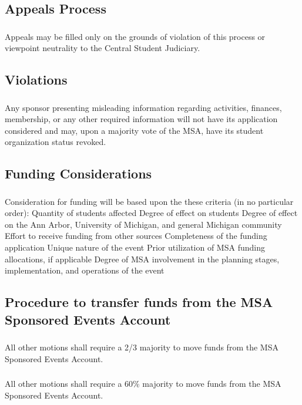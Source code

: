 \subsection{Appeals Process}
\subsubsection{}
Appeals may be filled only on the grounds of violation of this process or viewpoint neutrality to the Central Student Judiciary. 

\subsection{Violations}
\subsubsection{}
Any sponsor presenting misleading information regarding activities, finances, membership, or any other required information will not have its application considered and may, upon a majority vote of the MSA, have its student organization status revoked.  

\subsection{Funding Considerations}

\subsubsection{}
Consideration for funding will be based upon the these criteria (in no particular order):
\subsubsubsection{}
Quantity of students affected 
\subsubsubsection{}
Degree of effect on students
\subsubsubsection{}
Degree of effect on the Ann Arbor, University of Michigan, and general Michigan community
\subsubsubsection{}
Effort to receive funding from other sources
\subsubsubsection{}
Completeness of the funding application
\subsubsubsection{}
Unique nature of the event
\subsubsubsection{}
Prior utilization of MSA funding allocations, if applicable
\subsubsubsection{}
Degree of MSA involvement in the planning stages, implementation, and operations of the event

\subsection{Procedure to transfer funds from the MSA Sponsored Events Account}
\subsubsection{}
All other motions shall require a 2/3 majority to move funds from the MSA Sponsored Events Account. 
\subsubsection{}
All other motions shall require a 60\% majority to move funds from the MSA Sponsored Events Account.
